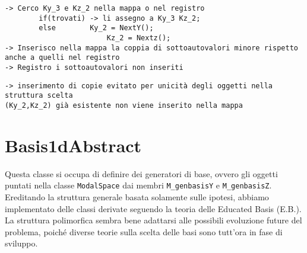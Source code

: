 \begin{lstlisting}[style = general,frame = top]
-> Cerco Ky_3 e Kz_2 nella mappa o nel registro
		if(trovati) -> li assegno a Ky_3 Kz_2;
		else		Ky_2 = NextY();
						Kz_2 = Nextz();
-> Inserisco nella mappa la coppia di sottoautovalori minore rispetto anche a quelli nel registro
-> Registro i sottoautovalori non inseriti
\end{lstlisting}


\begin{lstlisting}[style = general,frame=top]
-> inserimento di copie evitato per unicità degli oggetti nella struttura scelta
(Ky_2,Kz_2) già esistente non viene inserito nella mappa
\end{lstlisting}



 \section{Basis1dAbstract}

Questa classe si occupa di definire dei generatori di base, ovvero gli oggetti puntati nella classe \texttt{ModalSpace} dai membri \texttt{M\_genbasisY} e \texttt{M\_genbasisZ}. Ereditando la struttura generale basata solamente sulle ipotesi, abbiamo implementato delle classi derivate seguendo la teoria delle Educated Basis (E.B.). La struttura polimorfica sembra bene adattarsi alle possibili evoluzione future del problema, poich\'e diverse teorie sulla scelta delle basi sono tutt'ora in fase di sviluppo.
 

